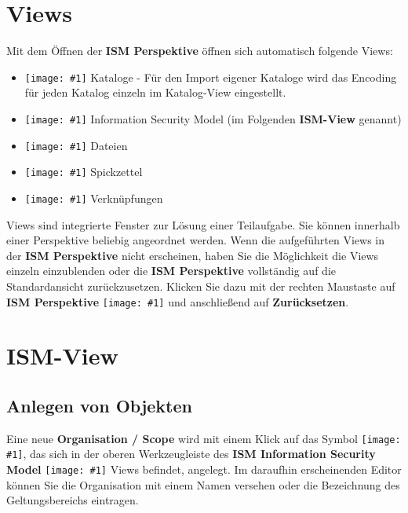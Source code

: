 \documentclass[a4paper,10pt]{book}
\newcommand{\icon}[1]{\texttt{[image: \#1]}}
\begin{document}
\section{Views}
Mit dem Öffnen der \textbf{ISM Perspektive} öffnen sich automatisch folgende Views:
\begin{itemize}
\item \icon{Icon/Control_Kataloge.png} Kataloge - Für den Import eigener Kataloge wird das Encoding für jeden Katalog einzeln im Katalog-View eingestellt.
\item \icon{Icon/Informationssicherheitsmodell.png} Information Security Model (im Folgenden \textbf{ISM-View} genannt)
\item \icon{Icon/Hinzufuegen.png} Dateien
\item \icon{Icon/Cheatsheet_view.png} Spickzettel
\item \icon{Icon/Verknuepfungen.png} Verknüpfungen
\end{itemize}
Views sind integrierte Fenster zur Lösung einer Teilaufgabe. Sie können innerhalb einer Perspektive beliebig angeordnet werden.
Wenn die aufgeführten Views in der \textbf{ISM Perspektive} nicht erscheinen, haben Sie die Möglichkeit die Views einzeln einzublenden oder die
\textbf{ISM Perspektive} vollständig auf die Standardansicht zurückzusetzen. Klicken Sie dazu mit der rechten Maustaste auf \textbf{ISM Perspektive}
\icon{Icon/Informationssicherheitsmodell.png} und anschließend auf \textbf{Zurücksetzen}.

\section{ISM-View}

\subsection{Anlegen von Objekten} \label{Anlegen von Objekten}
Eine neue \textbf{Organisation / Scope} wird mit einem Klick auf das Symbol \icon{Icon/Oeffnen.png},
das sich in der oberen Werkzeugleiste des \textbf{ISM Information Security Model} \icon{Icon/Informationssicherheitsmodell.png} Views befindet, angelegt.
Im daraufhin erscheinenden Editor können Sie die Organisation mit einem Namen versehen oder die Bezeichnung des Geltungsbereichs eintragen.
\end{document}
